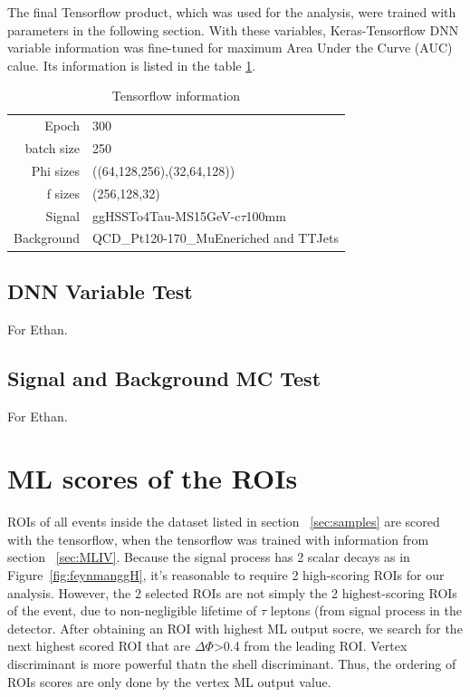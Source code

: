 The final Tensorflow product, which was used for the analysis, were trained with parameters in the following section. 
With these variables, Keras-Tensorflow DNN variable information was fine-tuned for maximum Area Under the Curve (AUC) calue.
Its information is listed in the table \ref{tab:ROIParam}.
\begin{table}[htb]
\caption{Tensorflow information}
\begin{center}
\begin{tabular}{r|l}\hline
Epoch & 300 \\
batch size & 250 \\
Phi sizes & ((64,128,256),(32,64,128)) \\
f sizes & (256,128,32) \\
Signal & ggHSSTo4Tau-MS15GeV-c$\tau$100mm  \\
Background & QCD\_Pt120-170\_MuEneriched and TTJets \\
 \hline
 \hline
\end{tabular}
\label{tab:ROIParam}
\end{center}
\end{table}
\subsection{DNN Variable Test}\label{sec:Ethan}
For Ethan.

\subsection{Signal and Background MC Test}\label{sec:Ethan2}
For Ethan.



\section{ML scores of the ROIs}

ROIs of all events inside the dataset listed in section ~\ref{sec:samples} are scored with the tensorflow, when the tensorflow was trained with information from section ~\ref{sec:MLIV}.
Because the signal process has 2 scalar decays as in Figure~\ref{fig:feynmanggH}, it's reasonable to require 2 high-scoring ROIs for our analysis.
However, the 2 selected ROIs are not simply the 2 highest-scoring ROIs of the event, due to non-negligible lifetime of $\tau$ leptons (from signal process in the detector.
After obtaining an ROI with highest ML output socre, we search for the next highest scored ROI that are $\Delta\Phi$>0.4 from the leading ROI.
Vertex discriminant is more powerful thatn the shell discriminant.
Thus, the ordering of ROIs scores are only done by the vertex ML output value.

